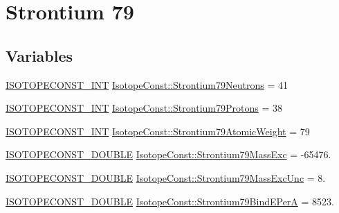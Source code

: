\hypertarget{group___isotope_const-_strontium-_sr79}{}\section{Strontium 79}
\label{group___isotope_const-_strontium-_sr79}
\subsection*{Variables}
\begin{DoxyCompactItemize}
\item 
\mbox{\hyperlink{group___isotope_const-_macros_ga5f18360b3e99483a35c32d789e62621c}{I\+S\+O\+T\+O\+P\+E\+C\+O\+N\+S\+T\+\_\+\+I\+NT}} \mbox{\hyperlink{group___isotope_const-_strontium-_sr79_gaa1a8d42f77fba1fdef59a2d8fa52ab5f}{Isotope\+Const\+::\+Strontium79\+Neutrons}} = 41
\item 
\mbox{\hyperlink{group___isotope_const-_macros_ga5f18360b3e99483a35c32d789e62621c}{I\+S\+O\+T\+O\+P\+E\+C\+O\+N\+S\+T\+\_\+\+I\+NT}} \mbox{\hyperlink{group___isotope_const-_strontium-_sr79_gaa9681827eda0e840cafefe343f9fb2ad}{Isotope\+Const\+::\+Strontium79\+Protons}} = 38
\item 
\mbox{\hyperlink{group___isotope_const-_macros_ga5f18360b3e99483a35c32d789e62621c}{I\+S\+O\+T\+O\+P\+E\+C\+O\+N\+S\+T\+\_\+\+I\+NT}} \mbox{\hyperlink{group___isotope_const-_strontium-_sr79_ga61bd0ac2614608f9481f7fc566315109}{Isotope\+Const\+::\+Strontium79\+Atomic\+Weight}} = 79
\item 
\mbox{\hyperlink{group___isotope_const-_macros_ga8f45a7272ce02c0b4c65c44636ed719a}{I\+S\+O\+T\+O\+P\+E\+C\+O\+N\+S\+T\+\_\+\+D\+O\+U\+B\+LE}} \mbox{\hyperlink{group___isotope_const-_strontium-_sr79_gaf3536931000512e569ca145f1919330c}{Isotope\+Const\+::\+Strontium79\+Mass\+Exc}} = -\/65476.
\item 
\mbox{\hyperlink{group___isotope_const-_macros_ga8f45a7272ce02c0b4c65c44636ed719a}{I\+S\+O\+T\+O\+P\+E\+C\+O\+N\+S\+T\+\_\+\+D\+O\+U\+B\+LE}} \mbox{\hyperlink{group___isotope_const-_strontium-_sr79_ga028d1589379e173ca3b7bf4a51b47684}{Isotope\+Const\+::\+Strontium79\+Mass\+Exc\+Unc}} = 8.
\item 
\mbox{\hyperlink{group___isotope_const-_macros_ga8f45a7272ce02c0b4c65c44636ed719a}{I\+S\+O\+T\+O\+P\+E\+C\+O\+N\+S\+T\+\_\+\+D\+O\+U\+B\+LE}} \mbox{\hyperlink{group___isotope_const-_strontium-_sr79_ga6b31970376e0015df7c37677734a786a}{Isotope\+Const\+::\+Strontium79\+Bind\+E\+PerA}} = 8523.
\item 

\end{DoxyCompactItemize}
